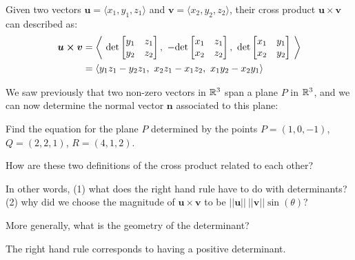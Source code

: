 \begin{theorem}\label{crossprodcomponents}
    
    Given two vectors $\bm{u} = \langle x_1, y_1, z_1 \rangle$ and $\bm{v}= \langle x_2, y_2, z_2 \rangle$, their cross product $\bm{u \times v}$ can described as:
    \begin{align*} \bm{u \times v} &= 
\left\langle \  \textnormal{det}\begin{bmatrix}
y_1 & z_1 \\
y_2 & z_2
\end{bmatrix}, \  - \textnormal{det}\begin{bmatrix}
x_1 & z_1 \\
x_2 & z_2
\end{bmatrix}, \ \textnormal{det}\begin{bmatrix}
x_1 & y_1  \\
x_2 & y_2  \\
\end{bmatrix} \ \right\rangle \\
&= 
\langle y_1z_1 - y_2z_1, \ x_2z_1 - x_1z_2, \ x_1y_2-x_2y_1  \rangle \\
\end{align*}
    
\end{theorem}


We saw previously that two non-zero vectors in $\mathbb{R}^3$ span a plane $P$ in $\mathbb{R}^3$, and we can now determine the normal vector $\bm{n}$ associated to this plane:

\begin{example}
    Find the equation for the plane $P$ determined by the points $P = (1,0,-1)$, $Q = (2,2,1)$, $R = (4,1,2)$.
    
    
\end{example}



\begin{motivating}
How are these two definitions of the cross product related to each other?
\end{motivating}

In other words, (1) what does the right hand rule have to do with determinants?  (2) why did we choose the magnitude of $\bm{u \times v}$ to be $||\bm{u}|| \ ||\bm{v}|| \sin(\theta)$?

More generally, what is the geometry of the determinant?

    \begin{proposition}
        The right hand rule corresponds to having a positive determinant.
    \end{proposition}

